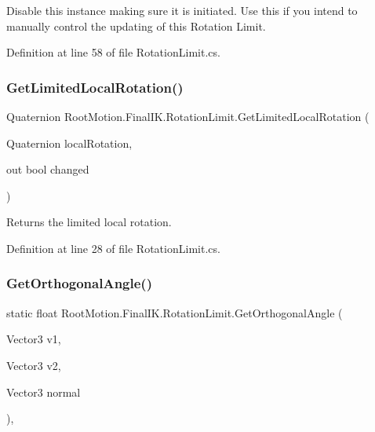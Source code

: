 Disable this instance making sure it is initiated. Use this if you intend to manually control the updating of this Rotation Limit. 



Definition at line 58 of file Rotation\+Limit.\+cs.

\mbox{\label{class_root_motion_1_1_final_i_k_1_1_rotation_limit_a7ea2b2741fcfb3aa5333474acb89e79d}} 
\subsubsection{\texorpdfstring{Get\+Limited\+Local\+Rotation()}{GetLimitedLocalRotation()}}
{\footnotesize\ttfamily Quaternion Root\+Motion.\+Final\+I\+K.\+Rotation\+Limit.\+Get\+Limited\+Local\+Rotation (\begin{DoxyParamCaption}\item[{Quaternion}]{local\+Rotation,  }\item[{out bool}]{changed }\end{DoxyParamCaption})}



Returns the limited local rotation. 



Definition at line 28 of file Rotation\+Limit.\+cs.

\mbox{\label{class_root_motion_1_1_final_i_k_1_1_rotation_limit_ac30eb4d472a7d7cd9910b0c72a1a4fd1}} 
\subsubsection{\texorpdfstring{Get\+Orthogonal\+Angle()}{GetOrthogonalAngle()}}
{\footnotesize\ttfamily static float Root\+Motion.\+Final\+I\+K.\+Rotation\+Limit.\+Get\+Orthogonal\+Angle (\begin{DoxyParamCaption}\item[{Vector3}]{v1,  }\item[{Vector3}]{v2,  }\item[{Vector3}]{normal }\end{DoxyParamCaption})\hspace{0.3cm}{\ttfamily [static]}, {\ttfamily [protected]}}



